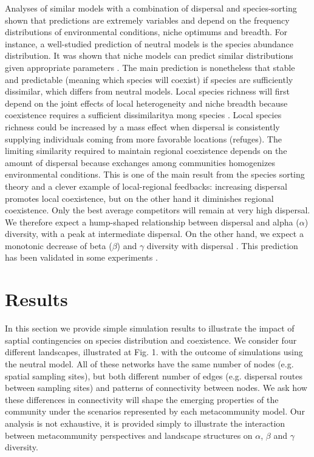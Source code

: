 \documentclass[12pt]{article}
\begin{document}
Analyses of similar models with a combination of dispersal and species-sorting
shown that predictions are extremely variables and depend on the frequency
distributions of environmental conditions, niche optimums and breadth. For
instance, a well-studied prediction of neutral models is the species abundance
distribution. It was shown that niche models can predict similar distributions
given appropriate parameters \parencite{Tilman2004,Gravel2006}. The main
prediction is nonetheless that stable and predictable (meaning which species
will coexist) if species are sufficiently dissimilar, which differs from neutral
models. Local species richness will first depend on the joint effects of local
heterogeneity and niche breadth because coexistence requires a sufficient
dissimilaritya mong species \parencite{Schwilk2005}. Local species richness
could be increased by a mass effect when dispersal is consistently supplying
individuals coming from more favorable locations (refuges). The limiting
similarity required to maintain regional coexistence depends on the amount of
dispersal because exchanges among communities homogenizes environmental
conditions. This is one of the main result from the species sorting theory and a
clever example of local-regional feedbacks: increasing dispersal promotes local
coexistence, but on the other hand it diminishes regional coexistence. Only the
best average competitors will remain at very high dispersal. We therefore expect
a hump-shaped relationship between dispersal and alpha ($\alpha$) diversity, with a peak at
intermediate dispersal. On the other hand, we expect a monotonic decrease of
beta ($\beta$) and $\gamma$ diversity with dispersal \parencite{Mouquet2003}. This prediction
has been validated in some experiments \parencite{Venail2008, Logue2011}.

\section{Results}

In this section we provide simple simulation results to illustrate the impact of
saptial contingencies on species distribution and coexistence. We consider four
different landscapes, illustrated at Fig. 1. with the outcome of simulations
using the neutral model. All of these networks have the same number of nodes
(e.g. spatial sampling sites), but both different number of edges (e.g.
dispersal routes between sampling sites) and patterns of connectivity between
nodes. We ask how these differences in connectivity will shape the emerging
properties of the community under the scenarios represented by each
metacommunity model. Our analysis is not exhaustive, it is provided simply to
illustrate the interaction between metacommunity perspectives and landscape
structures on $\alpha$, $\beta$ and $\gamma$ diversity.
\end{document}
